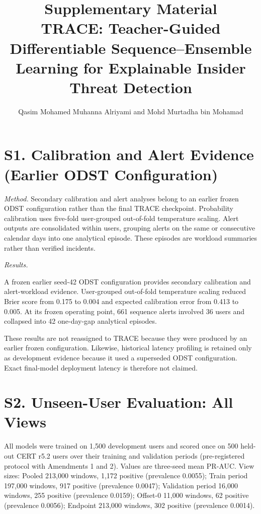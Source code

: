 \documentclass[10pt]{article}
\title{Supplementary Material\\[4pt]\large TRACE: Teacher-Guided Differentiable Sequence--Ensemble Learning for Explainable Insider Threat Detection}
\author{Qasim Mohamed Muhanna Alriyami and Mohd Murtadha bin Mohamad}
\date{}
\begin{document}
\maketitle
\section*{S1. Calibration and Alert Evidence (Earlier ODST Configuration)}

\textit{Method.} Secondary calibration and alert analyses belong to an earlier frozen ODST
configuration rather than the final TRACE checkpoint. Probability calibration
uses five-fold user-grouped out-of-fold temperature scaling. Alert outputs
are consolidated within users, grouping alerts on the same or consecutive
calendar days into one analytical episode. These episodes are workload
summaries rather than verified incidents.

\textit{Results.}

A frozen earlier seed-42 ODST configuration provides secondary calibration
and alert-workload evidence. User-grouped out-of-fold temperature scaling
reduced Brier score from 0.175 to 0.004 and expected calibration error from
0.413 to 0.005. At its frozen operating point, 661 sequence alerts involved
36 users and collapsed into 42 one-day-gap analytical episodes.

\smallskip
These results are not reassigned to TRACE because they were produced by an
earlier frozen configuration. Likewise, historical latency profiling is
retained only as development evidence because it used a superseded ODST
configuration. Exact final-model deployment latency is therefore not
claimed.



\section*{S2. Unseen-User Evaluation: All Views}
All models were trained on 1,500 development users and scored once on 500 held-out CERT r5.2 users over their training and validation periods (pre-registered protocol with Amendments 1 and 2). Values are three-seed mean PR-AUC. View sizes: Pooled 213,000 windows, 1,172 positive (prevalence 0.0055); Train period 197,000 windows, 917 positive (prevalence 0.0047); Validation period 16,000 windows, 255 positive (prevalence 0.0159); Offset-0 11,000 windows, 62 positive (prevalence 0.0056); Endpoint 213,000 windows, 302 positive (prevalence 0.0014).
\end{document}
